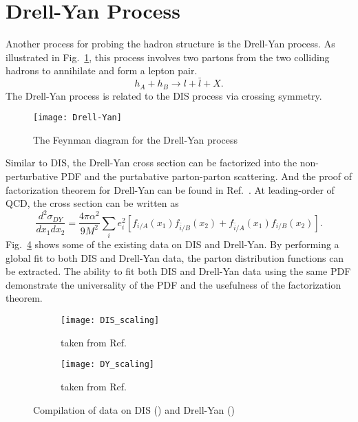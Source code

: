 \documentclass[../main.tex]{subfiles}
\begin{document}
\section{Drell-Yan Process}
\label{sec:DY}
Another process for probing the hadron structure is the Drell-Yan process\cite{drell1970}.
As illustrated in Fig.\ \ref{fig:DY}, this process involves two partons from the 
two colliding hadrons to annihilate and form a lepton pair.
\begin{equation}
	h_A + h_B \rightarrow l + \bar{l} + X.
\end{equation}
The Drell-Yan process is related to the DIS process via crossing symmetry.
\begin{figure}[htbp!]
	\centering
	\texttt{[image: Drell-Yan]}
    \caption{The Feynman diagram for the Drell-Yan process}
    \label{fig:DY}
\end{figure}
Similar to DIS, the Drell-Yan cross section can be factorized into the non-perturbative
PDF and the purtabative parton-parton scattering. And the proof of factorization 
theorem for Drell-Yan can be found in Ref.\ \cite{collins1989}. At leading-order 
of QCD, the cross section can be written as
\begin{equation}
	\frac{d^2\sigma_{DY}}{dx_{1}dx_{2}} = \frac{4\pi\alpha^2}{9M^2}\sum_i e^2_i
		\left[f_{i/A}\left(x_1\right)f_{\bar{i}/B}\left(x_2\right) +
			f_{\bar{i}/A}\left(x_1\right)f_{i/B}\left(x_2\right)
		\right].
	\label{eq:DY_cs}
\end{equation}
Fig.\ \ref{fig:scaling} shows some of the existing data on DIS and Drell-Yan. By
performing a global fit to both DIS and Drell-Yan data, the parton distribution 
functions can be extracted. The ability to fit both DIS and Drell-Yan data using 
the same PDF demonstrate the universality of the PDF and the usefulness of the 
factorization theorem. 
\begin{figure}[htbp!]
	\centering
	\begin{subfigure}{0.45\linewidth}
		\texttt{[image: DIS\_scaling]}
		\caption{taken from Ref.\ \cite{theh1collaboration2003}}
		\label{subfig:DIS_scaling}
	\end{subfigure}
	\begin{subfigure}{0.45\linewidth}
		\texttt{[image: DY\_scaling]}
		\caption{taken from Ref.\ \cite{mcgaughey1999}}
		\label{subfig:DY_scaling}
	\end{subfigure}
	\caption{Compilation of data on DIS () and 
		Drell-Yan ()}
	\label{fig:scaling}
\end{figure}
\end{document}
